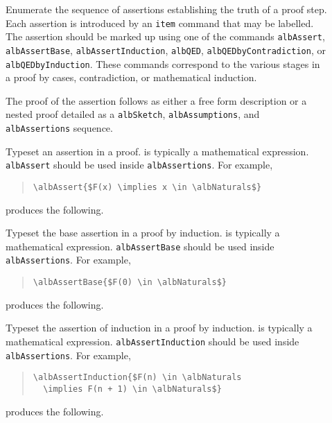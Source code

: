 \documentclass[11pt,a4paper,oneside,titlepage]{alb-latex}
\begin{document}
\begin{description}
\item[] Enumerate the sequence of assertions
  establishing the truth of a proof step.  Each assertion is introduced
  by an \texttt{item} command that may be labelled.  The assertion
  should be marked up using one of the commands \texttt{albAssert},
  \texttt{albAssertBase}, \texttt{albAssertInduction}, \texttt{albQED},
  \texttt{albQEDbyContradiction}, or \texttt{albQEDbyInduction}.  These
  commands correspond to the various stages in a proof by cases,
  contradiction, or mathematical induction.

  The proof of the assertion follows as either a free form description
  or a nested proof detailed as a \texttt{albSketch},
  \texttt{albAssumptions}, and \texttt{albAssertions} sequence.

\item[] Typeset an assertion
  in a proof.   is typically a mathematical
  expression.  \texttt{albAssert} should be used inside
  \texttt{albAssertions}.  For example,
  \begin{quote}
\begin{verbatim}
\albAssert{$F(x) \implies x \in \albNaturals$}
\end{verbatim}
  \end{quote}
  produces the following.
  \begin{quote}
  \end{quote}

\item[] Typeset the base
  assertion in a proof by induction.   is typically
  a mathematical expression.  \texttt{albAssertBase} should be used
  inside \texttt{albAssertions}.  For example,
  \begin{quote}
\begin{verbatim}
\albAssertBase{$F(0) \in \albNaturals$}
\end{verbatim}
  \end{quote}
  produces the following.
  \begin{quote}
  \end{quote}

\item[] Typeset the
  assertion of induction in a proof by induction.  
  is typically a mathematical expression.  \texttt{albAssertInduction}
  should be used inside \texttt{albAssertions}.  For example,
  \begin{quote}
\begin{verbatim}
\albAssertInduction{$F(n) \in \albNaturals
  \implies F(n + 1) \in \albNaturals$}
\end{verbatim}
  \end{quote}
  produces the following.
  \begin{quote}
  \end{quote}


\end{description}
\end{document}
